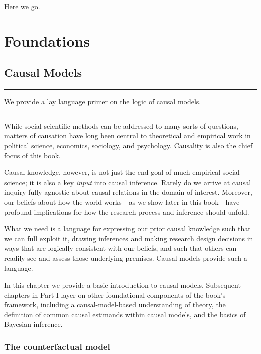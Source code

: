 \documentclass[12pt,]{book}
\begin{document}
Here we go.

\hypertarget{part-foundations}{%
\part{Foundations}\label{part-foundations}}

\hypertarget{models}{%
\chapter{Causal Models}\label{models}}

\begin{center}\rule{0.5\linewidth}{\linethickness}\end{center}

We provide a lay language primer on the logic of causal models.

\begin{center}\rule{0.5\linewidth}{\linethickness}\end{center}

While social scientific methods can be addressed to many sorts of questions, matters of causation have long been central to theoretical and empirical work in political science, economics, sociology, and psychology. Causality is also the chief focus of this book.

Causal knowledge, however, is not just the end goal of much empirical social science; it is also a key \emph{input} into causal inference. Rarely do we arrive at causal inquiry fully agnostic about causal relations in the domain of interest. Moreover, our beliefs about how the world works---as we show later in this book---have profound implications for how the research process and inference should unfold.

What we need is a language for expressing our prior causal knowledge such that we can full exploit it, drawing inferences and making research design decisions in ways that are logically consistent with our beliefs, and such that others can readily see and assess those underlying premises. Causal models provide such a language.

In this chapter we provide a basic introduction to causal models. Subsequent chapters in Part I layer on other foundational components of the book's framework, including a causal-model-based understanding of theory, the definition of common causal estimands within causal models, and the basics of Bayesian inference.

\hypertarget{the-counterfactual-model}{%
\section{The counterfactual model}\label{the-counterfactual-model}}
\end{document}
